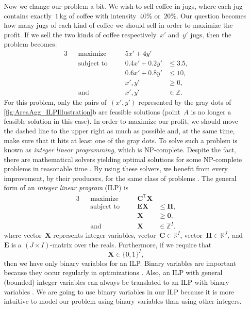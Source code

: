 Now we change our problem a bit.
We wish to sell coffee in jugs,
where each jug contains exactly~$1\,$kg of coffee 
with intensity~$40\%$ or~$20\%$.
Our question becomes how many jugs of each kind of coffee
we should sell in order to maximize the profit.
If we sell the two kinds of coffee 
respectively~$x'$ and~$y'$ jugs,
then the problem becomes:
\begin{alignat*}{3}
&&\text{maximize} 	\quad	&& 5x'+4y' 		&			\\
&&\text{subject to} \quad	&& 0.4x'+0.2y'	&\le 3.5, 	\\
&&					\quad	&& 0.6x'+0.8y' 	&\le 10, 	\\
&&					\quad	&& x', y' 		&\ge 0, 	\\
&&\text{and} 		\quad	&& x', y'		&\in \mathbb{Z}.
\end{alignat*}
For this problem, only the pairs of~$(x',y')$ 
represented by the gray dots of 
\fig\ref{fig:AreaAgg_ILPIllustration}b 
are feasible solutions
(point~$A$ is no longer a feasible solution in this case).
In order to maximize our profit,
we should move the dashed line to the upper right 
as much as possible
and, at the same time, make sure that 
it hits at least one of the gray dots.
To solve such a problem is known as
\emph{integer linear programming},
which is NP-complete.
Despite the fact, there are
mathematical solvers yielding optimal solutions
for some NP-complete problems in reasonable time
\parencite{Haunert2017Label}.
By using these solvers, 
we benefit from every improvement, by their producers,
for the same class of problems
\parencite{Haunert2017Label}.
The general form of an \emph{integer linear program} (ILP) is
\begin{alignat*}{3}
&&\text{maximize} 	\quad&& \bm{C}^\mathrm{T}\bm{X}	&		\\
&&\text{subject to} \quad&& \bm{EX}			&\le \bm{H}, 	\\
&&					\quad&& \bm{X} 			&\ge \bm{0}, 	\\
&&\text{and}		\quad&& \bm{X} 			&\in \mathbb{Z}^I.
\end{alignat*}
where vector~$\bm{X}$ represents integer variables, 
vector~$\bm{C} \in \mathbb{R}^I$, 
vector~$\bm{H} \in \mathbb{R}^J$,
and~$\bm{E}$ is a $(J \times I)$-matrix over the reals.
Furthermore, if we require that
$$
\bm{X} 	\in \{0,1\}^I,
$$
then we have only binary variables for an ILP.
Binary variables are important 
because they occur regularly in optimizations
\parencite[]{bradley1977applied}.
Also, an ILP with general (bounded) integer variables 
can always be translated to an ILP with binary variables
\parencite[]{Williams2009Integer}.
We are going to use binary variables in our ILP
because it is more intuitive 
to model our problem using binary variables
than using other integers.

